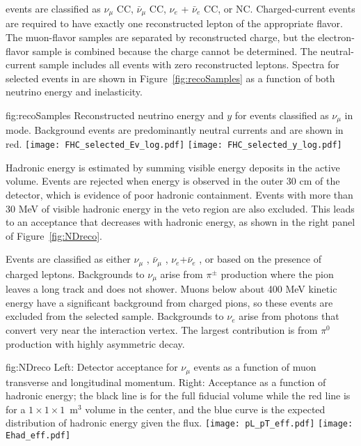  events are classified as $\nu_{\mu}$ CC, $\bar{\nu}_{\mu}$ CC, $\nu_{e}$ + $\bar{\nu}_{e}$ CC, or NC. Charged-current events are required to have exactly one reconstructed lepton of the appropriate flavor. The muon-flavor samples are separated by reconstructed charge, but the electron-flavor sample is combined because the charge cannot be determined. The neutral-current sample includes all events with zero reconstructed leptons. Spectra for selected \numu {} events in  are shown in Figure~\ref{fig:recoSamples} as a function of both neutrino energy and inelasticity.

\begin{dunefigure}{fig:recoSamples}
{Reconstructed neutrino energy and $y$ for events classified as $\nu_{\mu}$  in  mode. Background events are predominantly neutral currents and are shown in red.}
 \texttt{[image: FHC\_selected\_Ev\_log.pdf]}
 \texttt{[image: FHC\_selected\_y\_log.pdf]}
\end{dunefigure}

Hadronic energy is estimated by summing visible energy deposits in the active  volume. Events are rejected when energy is observed in the outer 30 cm of the detector, which is evidence of poor hadronic containment.  Events with more than 30 MeV of visible hadronic energy in the veto region are also excluded.  This leads to an acceptance that decreases with hadronic energy, as shown in the right panel of Figure~\ref{fig:NDreco}.


Events are classified as either $\nu_{\mu}$ , $\bar{\nu}_{\mu}$ , $\nu_{e}$+$\bar{\nu}_{e}$ , or  based on the presence of charged leptons. Backgrounds to $\nu_{\mu}$  arise from  $\pi^{\pm}$ production where the pion leaves a long track and does not shower. Muons below about 400 MeV kinetic energy have a significant background from charged pions, so these  events are excluded from the selected sample. Backgrounds to $\nu_{e}$  arise from photons that convert very near the interaction vertex. The largest contribution is from $\pi^{0}$ production with highly asymmetric decay.

\begin{dunefigure}[ND reconstruction]{fig:NDreco}
{Left: Detector acceptance for $\nu_{\mu}$  events as a function of muon transverse and longitudinal momentum. Right: Acceptance as a function of hadronic energy; the black line is for the full fiducial volume while the red line is for a $1 \times 1 \times 1$~m$^{3}$ volume in the center, and the blue curve is the expected distribution of hadronic energy given the  flux.}
 \texttt{[image: pL\_pT\_eff.pdf]}
 \texttt{[image: Ehad\_eff.pdf]}
\end{dunefigure}

